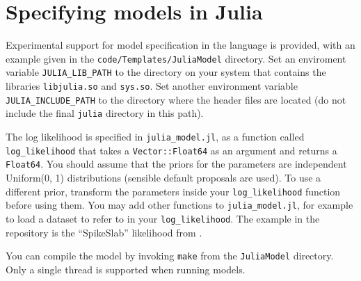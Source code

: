 \documentclass[article, nojss]{jss}
\begin{document}


\section{Specifying models in Julia}
Experimental support for model specification in the
 language is provided, with an example given in the
{\tt code/Templates/JuliaModel} directory.
Set an enviroment variable {\tt JULIA\_LIB\_PATH} to the directory on your
system that contains the libraries {\tt libjulia.so} and
{\tt sys.so}. Set another environment variable {\tt JULIA\_INCLUDE\_PATH}
to the directory where the  header files are located
(do not include the final {\tt julia} directory in this path).

The log likelihood is specified in {\tt julia\_model.jl}, as a function
called {\tt log\_likelihood} that takes a {\tt Vector::Float64} as an argument
and returns a {\tt Float64}. You should assume that the priors for the
parameters are independent Uniform(0, 1) distributions (sensible default
proposals are used). To use a different prior, transform the parameters inside
your {\tt log\_likelihood} function before using them.
You may add other functions to {\tt julia\_model.jl}, for example to load
a dataset to refer to in your {\tt log\_likelihood}. The example in
the repository is the ``SpikeSlab'' likelihood from
\citet{brewer2011diffusive}.

You can compile the model by invoking {\tt make}
from the {\tt JuliaModel} directory.
Only a single thread is supported when running 
models.
\end{document}
